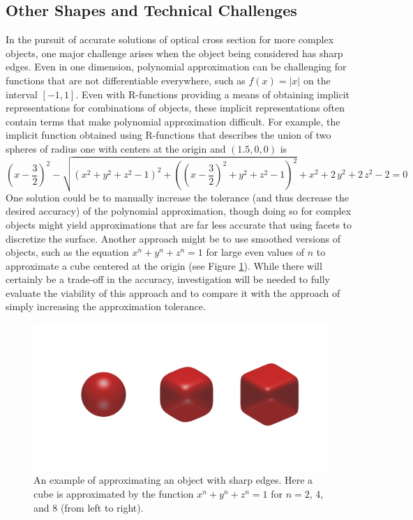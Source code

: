\documentclass[11pt]{amsart}
\theoremstyle{definition}
\begin{document}
\subsection{Other Shapes and Technical Challenges}

In the pursuit of accurate solutions of optical cross section for more complex objects, one major challenge arises when the object being considered has sharp edges. Even in one dimension, polynomial approximation can be challenging for functions that are not differentiable everywhere, such as $f(x) = |x|$ on the interval $[-1,1]$. Even with R-functions providing a means of obtaining implicit representations for combinations of objects, these implicit representations often contain terms that make polynomial approximation difficult. For example, the implicit function obtained using R-functions that describes the union of two spheres of radius one with centers at the origin and $(1.5,0,0)$ is
\[{\left(x-\frac{3}{2}\right)}^2-\sqrt{{\left(x^2+y^2+z^2-1\right)}^2+{\left({\left(x-\frac{3}{2}\right)}^2+y^2+z^2-1\right)}^2}+x^2+2\,y^2+2\,z^2-2 = 0\]
One solution could be to manually increase the tolerance (and thus decrease the desired accuracy) of the polynomial approximation, though doing so for complex objects might yield approximations that are far less accurate that using facets to discretize the surface. Another approach might be to use smoothed versions of objects, such as the equation $x^n + y^n + z^n = 1$ for large even values of $n$ to approximate a cube centered at the origin (see Figure \ref{cubes}).  While there will certainly be a trade-off in the accuracy, investigation will be needed to fully evaluate the viability of this approach and to compare it with the approach of simply increasing the approximation tolerance.
\begin{figure}[H]
\includegraphics[width=\linewidth]{./figs/cubes.pdf}
\caption{An example of approximating an object with sharp edges. Here a cube is approximated by the function $x^n + y^n + z^n = 1$ for $n = 2$, 4, and 8 (from left to right).}
\label{cubes}
\end{figure}
\end{document}
